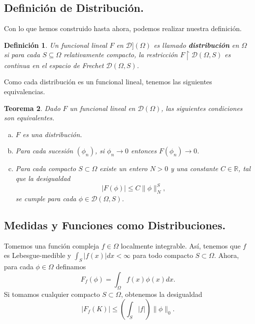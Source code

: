 \documentclass[letter,12pt]{article}
\newcommand\norm[1]{\lVert#1\rVert}
\newtheorem{theorem}{Teorema}
\newtheorem{definition}[theorem]{Definición}
\begin{document}
\subsection{Definición de Distribución.}

Con lo que hemos construido hasta ahora, podemos realizar nuestra definición.

\begin{definition}\normalfont
	Un funcional lineal $ F $ en $ \mathscr{D}](\Omega) $ es llamado
	\textbf{distribución} en $ \Omega $ si para cada $ S\subseteq\Omega $ relativamente
	compacto, la restricción $ F\restriction{\mathscr{D}(\Omega, S)} $ es continua en
	el espacio de Frechet $ \mathscr{D}(\Omega, S) $.
\end{definition}

Como cada distribución es un funcional lineal, tenemos las siguientes equivalencias.
\begin{theorem}\label{col:equiv}\normalfont
	Dado $ F $ un funcional lineal en $ \mathscr{D}(\Omega) $, las siguientes
	condiciones son equivalentes.
	\begin{enumerate}[(a)]
		\item $ F $ es una distribución.
		\item Para cada sucesión $ (\phi_n) $, si $ \phi_n \to 0 $ entonces
		$ F(\phi_n) \to 0 $.
		\item Para cada compacto $ S\subset\Omega $ existe un entero
		$ N > 0 $  y una constante $ C \in \mathbb{R} $, tal que la
		desigualdad
		\begin{equation}
			|F(\phi)| \leq C \norm{\phi}^S_N,
		\end{equation}
		se cumple para cada $ \phi \in \mathscr{D}(\Omega, S)$.
	\end{enumerate}
\end{theorem}

\subsection{Medidas y Funciones como Distribuciones.}
Tomemos una función compleja $ f\in \Omega $ localmente integrable.
Así, tenemos que $ f $ es Lebesgue-medible y $ \int_{S}|f(x)|dx < \infty $
para todo compacto $ S\subset\Omega $.
Ahora, para cada $ \phi \in \Omega $ definamos
\begin{equation}
	F_{f}(\phi) = \int_{\Omega}{f(x)\phi(x)}dx.
\end{equation}
Si tomamos cualquier compacto $ S\subset \Omega $, obtenemos la desigualdad
\begin{equation}\label{key}
	|F_f(K)| \leq \left( \int_{S}|f| \right) \norm{\phi}_0.
\end{equation}
\end{document}
